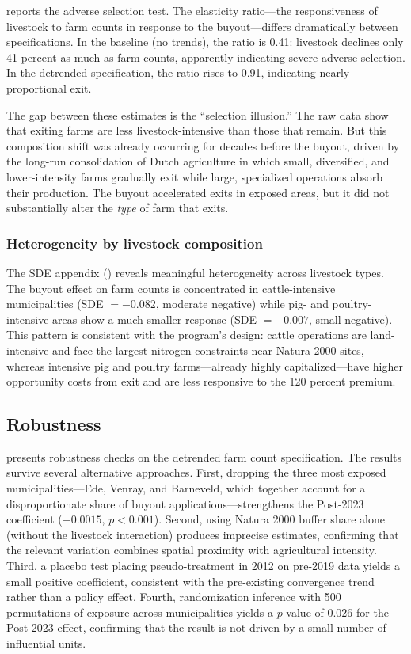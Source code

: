 \documentclass[12pt]{article}
\begin{document}


 reports the adverse selection test. The elasticity ratio---the responsiveness of livestock to farm counts in response to the buyout---differs dramatically between specifications. In the baseline (no trends), the ratio is 0.41: livestock declines only 41 percent as much as farm counts, apparently indicating severe adverse selection. In the detrended specification, the ratio rises to 0.91, indicating nearly proportional exit.

The gap between these estimates is the ``selection illusion.'' The raw data show that exiting farms are less livestock-intensive than those that remain. But this composition shift was already occurring for decades before the buyout, driven by the long-run consolidation of Dutch agriculture in which small, diversified, and lower-intensity farms gradually exit while large, specialized operations absorb their production. The buyout accelerated exits in exposed areas, but it did not substantially alter the \textit{type} of farm that exits.

\subsubsection*{Heterogeneity by livestock composition} The SDE appendix () reveals meaningful heterogeneity across livestock types. The buyout effect on farm counts is concentrated in cattle-intensive municipalities (SDE $= -0.082$, moderate negative) while pig- and poultry-intensive areas show a much smaller response (SDE $= -0.007$, small negative). This pattern is consistent with the program's design: cattle operations are land-intensive and face the largest nitrogen constraints near Natura 2000 sites, whereas intensive pig and poultry farms---already highly capitalized---have higher opportunity costs from exit and are less responsive to the 120 percent premium.

\subsection{Robustness}
\label{sec:robustness}



 presents robustness checks on the detrended farm count specification. The results survive several alternative approaches. First, dropping the three most exposed municipalities---Ede, Venray, and Barneveld, which together account for a disproportionate share of buyout applications---strengthens the Post-2023 coefficient ($-0.0015$, $p < 0.001$). Second, using Natura 2000 buffer share alone (without the livestock interaction) produces imprecise estimates, confirming that the relevant variation combines spatial proximity with agricultural intensity. Third, a placebo test placing pseudo-treatment in 2012 on pre-2019 data yields a small positive coefficient, consistent with the pre-existing convergence trend rather than a policy effect. Fourth, randomization inference with 500 permutations of exposure across municipalities yields a $p$-value of 0.026 for the Post-2023 effect, confirming that the result is not driven by a small number of influential units.
\end{document}
